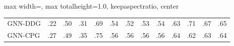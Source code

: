 \begin{table}[!htbp]
\begin{adjustbox}{
    max width=\columnwidth,
    max totalheight=1.0\textheight,
    keepaspectratio,
    center
}
\begin{tabular}{@{}l*{12}{c}@{}}
GNN-DDG
& .22 & .50 & .31 & .69
& .54 & .52 & .53 & .54
& .63 & .71 & .67 & .65 \\

GNN-CPG
& .27 & .49 & .35 & .75
& .56 & .56 & .56 & .56
& .64 & .62 & .63 & .64 \\

\bottomrule
\end{tabular}
\end{adjustbox}

\vspace{0.4ex}
{\scriptsize {}}

\end{table}

